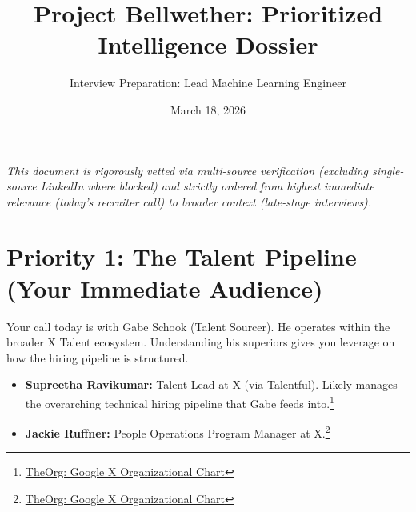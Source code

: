 \documentclass[11pt]{article}
\title{Project Bellwether: Prioritized Intelligence Dossier}
\author{Interview Preparation: Lead Machine Learning Engineer}
\date{March 18, 2026}
\begin{document}
\maketitle

\noindent\textit{This document is rigorously vetted via multi-source verification (excluding single-source LinkedIn where blocked) and strictly ordered from highest immediate relevance (today's recruiter call) to broader context (late-stage interviews).}

\section{Priority 1: The Talent Pipeline (Your Immediate Audience)}
Your call today is with Gabe Schook (Talent Sourcer). He operates within the broader X Talent ecosystem. Understanding his superiors gives you leverage on how the hiring pipeline is structured.
\begin{itemize}[leftmargin=*]
    \item \textbf{Supreetha Ravikumar:} Talent Lead at X (via Talentful). Likely manages the overarching technical hiring pipeline that Gabe feeds into.\footnote{\href{https://theorg.com/org/google-x}{TheOrg: Google X Organizational Chart}}
    \item \textbf{Jackie Ruffner:} People Operations Program Manager at X.\footnote{\href{https://theorg.com/org/google-x}{TheOrg: Google X Organizational Chart}}
\end{itemize}
\end{document}
